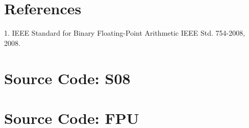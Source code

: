 \documentclass[letterpaper, 12pt]{article}
\begin{document}
\begin{flushleft}
\section*{References}
1. IEEE Standard for Binary Floating-Point Arithmetic IEEE Std. 754-2008, 2008. 

\newpage
\section*{Source Code: S08}

\newpage
\section*{Source Code: FPU}

\end{flushleft}
\end{document}
